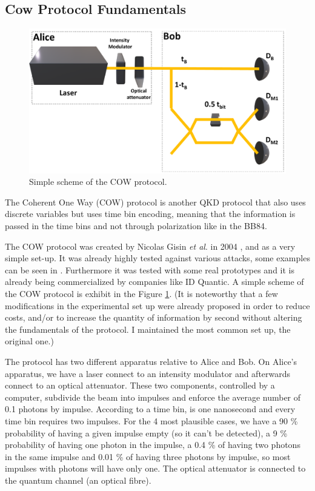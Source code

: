\begin{refsection}
\subsection{Cow Protocol Fundamentals}

\begin{figure}[h]
\centering
\includegraphics[width=1\linewidth]{./sdf/tq_76558_cow_protocol/slides/figures/Full2.pdf}
\caption{Simple scheme of the COW protocol.}
\label{fig:Scheme}
\end{figure}

The Coherent One Way (COW) protocol is another QKD protocol that also uses discrete variables but uses time bin encoding, meaning that the information is passed in the time bins and not through polarization like in the BB84.

The COW protocol was created by Nicolas Gisin \textit{et al}. in 2004 \cite{gisin2004towards}, and as a very simple set-up. It was already highly tested against various attacks, some examples can be seen in \cite{branciard2006zero}. Furthermore it was tested with some real prototypes \cite{stucki2009continuous} and it is already being commercialized by companies like ID Quantic. A simple scheme of the COW protocol is exhibit in the Figure \ref{fig:Scheme}. (It is noteworthy that a few modifications in the experimental set up were already proposed \cite{roberts2017modulator} in order to reduce costs, and/or to increase the quantity of information by second without altering the fundamentals of the protocol. I maintained the most common set up, the original one.)

The protocol has two different apparatus relative to Alice and Bob. On Alice's apparatus, we have a laser connect to an intensity modulator and afterwards connect to an optical attenuator. These two components, controlled by a computer, subdivide the beam into impulses and enforce the average number of 0.1 photons by impulse. According to \cite{gisin2004towards} a time bin, is one nanosecond and every time bin requires two impulses. For the 4 most plausible cases, we have a 90 \% probability of having a given impulse empty (so it can't be detected), a 9 \% probability of having one photon in the impulse, a 0.4 \% of having two photons in the same impulse and 0.01 \% of having three photons by impulse, so most impulses with photons will have only one. The optical attenuator is connected to the quantum channel (an optical fibre).


\end{refsection}
